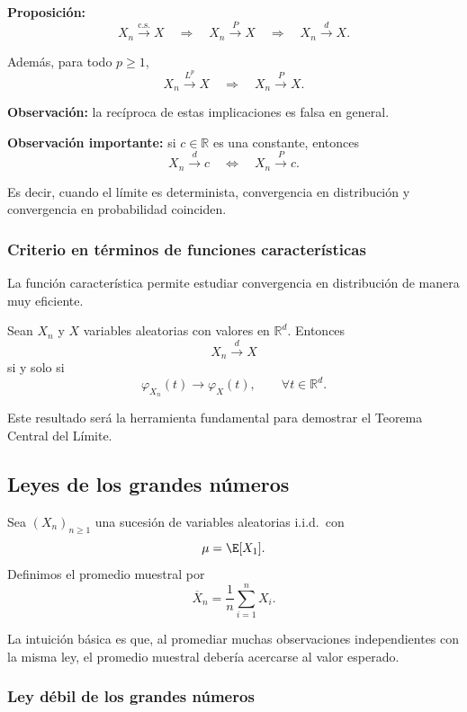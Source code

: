 \textbf{Proposición:}
\[
X_n \xrightarrow{\mathrm{c.s.}} X
\quad\Longrightarrow\quad
X_n \xrightarrow{P} X
\quad\Longrightarrow\quad
X_n \xrightarrow{d} X.
\]

Además, para todo $p\ge 1$,
\[
X_n \xrightarrow{L^p} X
\quad\Longrightarrow\quad
X_n \xrightarrow{P} X.
\]

\medskip

\noindent
\textbf{Observación:} la recíproca de estas implicaciones es falsa en general.

\medskip

\noindent
\textbf{Observación importante:} si $c\in\mathbb{R}$ es una constante, entonces
\[
X_n \xrightarrow{d} c
\quad\Longleftrightarrow\quad
X_n \xrightarrow{P} c.
\]

Es decir, cuando el límite es determinista, convergencia en distribución y convergencia en probabilidad coinciden.

\subsubsection*{Criterio en términos de funciones características}

La función característica permite estudiar convergencia en distribución de manera muy eficiente.

\begin{teo}
Sean $X_n$ y $X$ variables aleatorias con valores en $\mathbb{R}^d$. Entonces
\[
X_n \xrightarrow{d} X
\]
si y solo si
\[
\varphi_{X_n}(t)\to \varphi_X(t),
\qquad \forall t\in\mathbb{R}^d.
\]
\end{teo}

Este resultado será la herramienta fundamental para demostrar el Teorema Central del Límite.

\subsection{Leyes de los grandes números}

Sea $(X_n)_{n\ge 1}$ una sucesión de variables aleatorias i.i.d.\ con
\[
\mu=\E[X_1].
\]
Definimos el promedio muestral por
\[
\overline{X}_n=\frac{1}{n}\sum_{i=1}^n X_i.
\]

La intuición básica es que, al promediar muchas observaciones independientes con la misma ley, el promedio muestral debería acercarse al valor esperado.

\subsubsection*{Ley débil de los grandes números}

